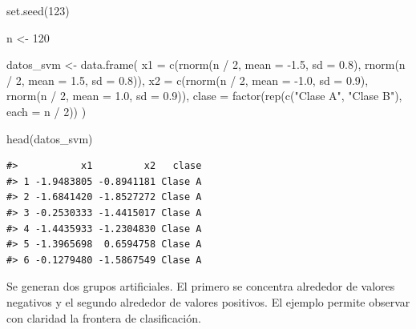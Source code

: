 \documentclass[
  spanish,
  10.5pt,
  letterpaper,
  openany,
  headings=big]{scrbook}
\newenvironment{Shaded}{}{}
\newcommand{\AttributeTok}[1]{\textcolor[rgb]{0.84,0.23,0.29}{#1}}
\newcommand{\DecValTok}[1]{\textcolor[rgb]{0.00,0.36,0.77}{#1}}
\newcommand{\FloatTok}[1]{\textcolor[rgb]{0.00,0.36,0.77}{#1}}
\newcommand{\FunctionTok}[1]{\textcolor[rgb]{0.44,0.26,0.76}{#1}}
\newcommand{\NormalTok}[1]{\textcolor[rgb]{0.14,0.16,0.18}{#1}}
\newcommand{\OtherTok}[1]{\textcolor[rgb]{0.44,0.26,0.76}{#1}}
\newcommand{\SpecialCharTok}[1]{\textcolor[rgb]{0.00,0.36,0.77}{#1}}
\newcommand{\StringTok}[1]{\textcolor[rgb]{0.01,0.18,0.38}{#1}}
\begin{document}
\begin{Shaded}
\begin{Highlighting}[]
\FunctionTok{set.seed}\NormalTok{(}\DecValTok{123}\NormalTok{)}

\NormalTok{n }\OtherTok{\textless{}{-}} \DecValTok{120}

\NormalTok{datos\_svm }\OtherTok{\textless{}{-}} \FunctionTok{data.frame}\NormalTok{(}
  \AttributeTok{x1 =} \FunctionTok{c}\NormalTok{(}\FunctionTok{rnorm}\NormalTok{(n }\SpecialCharTok{/} \DecValTok{2}\NormalTok{, }\AttributeTok{mean =} \SpecialCharTok{{-}}\FloatTok{1.5}\NormalTok{, }\AttributeTok{sd =} \FloatTok{0.8}\NormalTok{),}
         \FunctionTok{rnorm}\NormalTok{(n }\SpecialCharTok{/} \DecValTok{2}\NormalTok{, }\AttributeTok{mean =}  \FloatTok{1.5}\NormalTok{, }\AttributeTok{sd =} \FloatTok{0.8}\NormalTok{)),}
  \AttributeTok{x2 =} \FunctionTok{c}\NormalTok{(}\FunctionTok{rnorm}\NormalTok{(n }\SpecialCharTok{/} \DecValTok{2}\NormalTok{, }\AttributeTok{mean =} \SpecialCharTok{{-}}\FloatTok{1.0}\NormalTok{, }\AttributeTok{sd =} \FloatTok{0.9}\NormalTok{),}
         \FunctionTok{rnorm}\NormalTok{(n }\SpecialCharTok{/} \DecValTok{2}\NormalTok{, }\AttributeTok{mean =}  \FloatTok{1.0}\NormalTok{, }\AttributeTok{sd =} \FloatTok{0.9}\NormalTok{)),}
  \AttributeTok{clase =} \FunctionTok{factor}\NormalTok{(}\FunctionTok{rep}\NormalTok{(}\FunctionTok{c}\NormalTok{(}\StringTok{"Clase A"}\NormalTok{, }\StringTok{"Clase B"}\NormalTok{), }\AttributeTok{each =}\NormalTok{ n }\SpecialCharTok{/} \DecValTok{2}\NormalTok{))}
\NormalTok{)}

\FunctionTok{head}\NormalTok{(datos\_svm)}
\end{Highlighting}
\end{Shaded}

\begin{verbatim}
#>           x1         x2   clase
#> 1 -1.9483805 -0.8941181 Clase A
#> 2 -1.6841420 -1.8527272 Clase A
#> 3 -0.2530333 -1.4415017 Clase A
#> 4 -1.4435933 -1.2304830 Clase A
#> 5 -1.3965698  0.6594758 Clase A
#> 6 -0.1279480 -1.5867549 Clase A
\end{verbatim}

\begin{tcolorbox}[enhanced jigsaw, arc=.35mm, bottomrule=.15mm, bottomtitle=1mm, breakable, colback=white, colbacktitle=quarto-callout-note-color!10!white, colframe=quarto-callout-note-color-frame, coltitle=black, left=2mm, leftrule=.75mm, opacityback=0, opacitybacktitle=0.6, rightrule=.15mm, title=\textcolor{quarto-callout-note-color}{\faInfo}\hspace{0.5em}{Explicación del código}, titlerule=0mm, toprule=.15mm, toptitle=1mm]

Se generan dos grupos artificiales. El primero se concentra alrededor de
valores negativos y el segundo alrededor de valores positivos. El
ejemplo permite observar con claridad la frontera de clasificación.

\end{tcolorbox}
\end{document}
